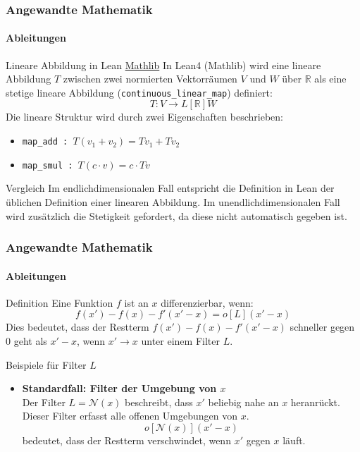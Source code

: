 \documentclass{beamer}
\begin{document}
    \begin{frame}
        \frametitle{Angewandte Mathematik}
        \framesubtitle{Ableitungen}
    
        \begin{block}{Lineare Abbildung in Lean \href{https://github.com/leanprover-community/mathlib4/blob/f4f0b47a2f859d27e965c812344deb1435fe8d48/Mathlib/Topology/Algebra/Module/Basic.lean\#L222-L225}{Mathlib}}
            In Lean4 (Mathlib) wird eine lineare Abbildung \( T \) zwischen zwei normierten Vektorräumen \( V \) und \( W \) über \( \mathbb{R} \) als eine stetige lineare Abbildung (\texttt{continuous\_linear\_map}) definiert:
            \[
            T : V \to L[\mathbb{R}] W
            \]
            Die lineare Struktur wird durch zwei Eigenschaften beschrieben:
            \begin{itemize}
                \item \texttt{map\_add : $T (v_1 + v_2) = T v_1 + T v_2$}
                \item \texttt{map\_smul : $T (c \cdot v) = c \cdot T v$}
            \end{itemize}
        \end{block}
    
        \begin{block}{Vergleich}
           Im endlichdimensionalen Fall entspricht die Definition in Lean der üblichen Definition einer linearen Abbildung. 
           Im unendlichdimensionalen Fall wird zusätzlich die Stetigkeit gefordert, da diese nicht automatisch gegeben ist.
        \end{block}
        
    \end{frame}
    

\begin{frame}
    \frametitle{Angewandte Mathematik}
    \framesubtitle{Ableitungen}

\begin{block}{Definition}
  Eine Funktion \( f \) ist an \( x \) differenzierbar, wenn:
  \[
  f(x') - f(x) - f'(x' - x) = o[L](x' - x)
  \]
  Dies bedeutet, dass der Restterm \( f(x') - f(x) - f'(x' - x) \) schneller gegen 0 geht als \( x' - x \), wenn \( x' \to x \) unter einem Filter \( L \).
\end{block}

\begin{block}{Beispiele für Filter \( L \)}
  \begin{itemize}
    \item \textbf{Standardfall: Filter der Umgebung von \( x \)} \\
    Der Filter \( L = \mathcal{N}(x) \) beschreibt, dass \( x' \) beliebig nahe an \( x \) heranrückt. Dieser Filter erfasst alle offenen Umgebungen von \( x \). 
    \[
    o[{\mathcal{N}(x)}](x' - x)
    \]
    bedeutet, dass der Restterm verschwindet, wenn \( x' \) gegen \( x \) läuft.
  \end{itemize}
\end{block}
\end{frame}
\end{document}
